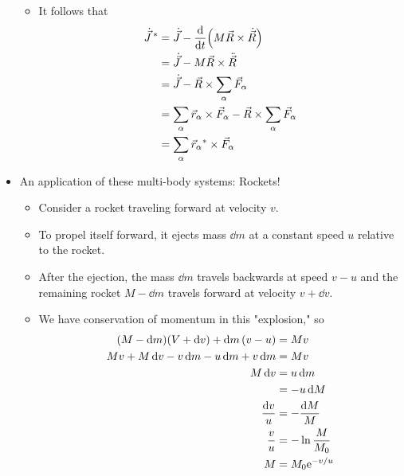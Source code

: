 \documentclass[../notes.tex]{subfiles}
\begin{document}
\begin{itemize}
\begin{itemize}
\begin{equation*}
        \end{equation*}
        \item It follows that
        \begin{align*}
            \dot{\vec{J}}{\,}^* &= \dot{\vec{J}}-\dv{t}(M\vec{R}\times\dot{\vec{R}})\\
            &= \dot{\vec{J}}-M\vec{R}\times\ddot{\vec{R}}\\
            &= \dot{\vec{J}}-\vec{R}\times\sum_\alpha\vec{F}_\alpha\\
            &= \sum_\alpha\vec{r}_\alpha\times\vec{F}_\alpha-\vec{R}\times\sum_\alpha\vec{F}_\alpha\\
            &= \sum_\alpha\vec{r}_\alpha{}^*\times\vec{F}_\alpha
        \end{align*}
    \end{itemize}
    \item An application of these multi-body systems: Rockets!
    \begin{itemize}
        \item Consider a rocket traveling forward at velocity $v$.
        \item To propel itself forward, it ejects mass $\dd{m}$ at a constant speed $u$ relative to the rocket.
        \item After the ejection, the mass $\dd{m}$ travels backwards at speed $v-u$ and the remaining rocket $M-\dd{m}$ travels forward at velocity $v+\dd{v}$.
        \item We have conservation of momentum in this "explosion," so
        \begin{align*}
            (M-\dd{m})(V+\dd{v})+\dd{m}(v-u) &= Mv\\
            Mv+M\dd{v}-v\dd{m}-u\dd{m}+v\dd{m} &= Mv\\
            M\dd{v} &= u\dd{m}\\
            &= -u\dd{M}\\
            \frac{\dd{v}}{u} &= -\frac{\dd{M}}{M}\\
            \frac{v}{u} &= -\ln\frac{M}{M_0}\\
            M &= M_0\e[-v/u]
        \end{align*}
    \end{itemize}
\end{itemize}
\end{document}

